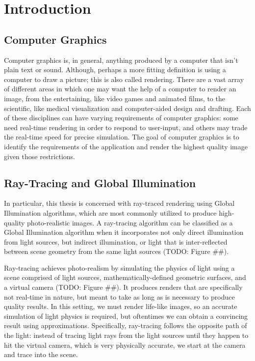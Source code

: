
\chapter{Introduction}
\label{intro}

\section{Computer Graphics}
Computer graphics is, in general, anything produced by a computer that isn’t plain text or sound. Although, perhaps a more fitting definition is using a computer to draw a picture; this is also called rendering. There are a vast array of different areas in which one may want the help of a computer to render an image, from the entertaining, like video games and animated films, to the scientific, like medical visualization and computer-aided design and drafting. Each of these disciplines can have varying requirements of computer graphics: some need real-time rendering in order to respond to user-input, and others may trade the real-time speed for precise simulation. The goal of computer graphics is to identify the requirements of the application and render the highest quality image given those restrictions.

\section{Ray-Tracing and Global Illumination}
In particular, this thesis is concerned with ray-traced rendering using Global Illumination algorithms, which are most commonly utilized to produce high-quality photo-realistic images. A ray-tracing algorithm can be classified as a Global Illumination algorithm when it incorporates not only direct illumination from light sources, but indirect illumination, or light that is inter-reflected between scene geometry from the same light sources (TODO: Figure \#\#).

Ray-tracing achieves photo-realism by simulating the physics of light using a scene comprised of light sources, mathematically-defined geometric surfaces, and a virtual camera (TODO: Figure \#\#). It produces renders that are specifically not real-time in nature, but meant to take as long as is necessary to produce quality results. In this setting, we must render life-like images, so an accurate simulation of light physics is required, but oftentimes we can obtain a convincing result using approximations. Specifically, ray-tracing follows the opposite path of the light: instead of tracing light rays from the light sources until they happen to hit the virtual camera, which is very physically accurate, we start at the camera and trace into the scene.

